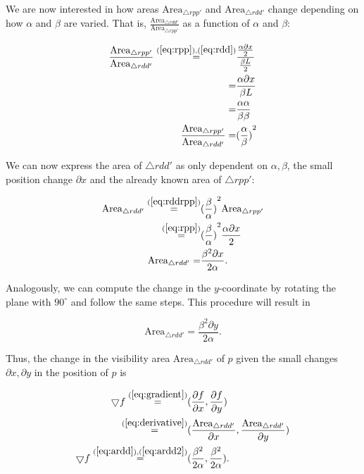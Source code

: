 We are now interested in how areas $\text{Area}_{\triangle rpp'}$ and $\text{Area}_{\triangle rdd'}$ change depending on how $\alpha$ and $\beta$ are varied. That is, $\frac{\text{Area}_{\triangle rdd'}}{\text{Area}_{\triangle rpp'}}$ as a function of $\alpha$ and $\beta$: 

\begin{align}
    \frac{\text{Area}_{\triangle rpp'}}{\text{Area}_{\triangle rdd'}} \overset{(\ref{eq:rpp}), (\ref{eq:rdd})}{=} &\frac{\frac{\alpha \partial x}{2}}{\frac{\beta L}{2}} \\
    = &\frac{\alpha \partial x}{\beta L} \\
    = &\frac{\alpha \alpha}{\beta \beta} \\
    \frac{\text{Area}_{\triangle rpp'}}{\text{Area}_{\triangle rdd'}} = &{(\frac \alpha \beta)}^2 \label{eq:rddrpp}
\end{align}

We can now express the area of $\triangle rdd'$ as only dependent on $\alpha, \beta$, the small position change $\partial x$ and the already known area of $\triangle rpp'$:

\begin{align}
    \text{Area}_{\triangle rdd'} \overset{(\ref{eq:rddrpp})}{=} &{(\frac \beta \alpha)}^2 \text{Area}_{\triangle rpp'} \\
    \overset{(\ref{eq:rpp})}{=} &{(\frac \beta \alpha)}^2 \frac{\alpha \partial x}{2} \\
    \text{Area}_{\triangle rdd'} = &\frac{\beta^2 \partial x}{2\alpha}. \label{eq:ardd}
\end{align}

Analogously, we can compute the change in the $y$-coordinate by rotating the plane with $90^\circ$ and follow the same steps. This procedure will result in

\begin{equation}
    \text{Area}_{\triangle rdd'} = \frac{\beta^2 \partial y}{2\alpha}. \label{eq:ardd2}
\end{equation}

Thus, the change in the visibility area $\text{Area}_{\triangle rdd'}$ of $p$ given the small changes $\partial x, \partial y$ in the position of $p$ is 

\begin{align*}
    \bigtriangledown f \overset{(\ref{eq:gradient})}{=} &(\frac{\partial f}{\partial x}, \frac{\partial f}{\partial y}) \\
    \overset{(\ref{eq:derivative})}{=} &(\frac{\text{Area}_{\triangle rdd'}}{\partial x}, \frac{\text{Area}_{\triangle rdd'}}{\partial y}) \\
    \bigtriangledown f \overset{(\ref{eq:ardd}), (\ref{eq:ardd2})}{=} &(\frac{\beta^2}{2\alpha}, \frac{\beta^2}{2\alpha}). \\
\end{align*}

